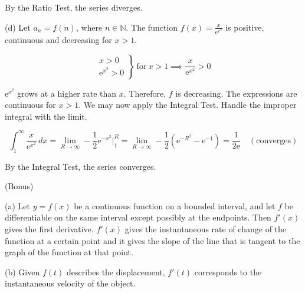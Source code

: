 \documentclass{article}
\begin{document}
\hfill

\noindent By the Ratio Test, the series diverges.

\hfill

\noindent (d) Let $a_n=f(n)$, where $n\in\mathbb{N}$. The function $\displaystyle f(x)=\frac x{\mathrm{e}^{x^2}}$ is positive, continuous and decreasing for $x>1$.

\[\left.\begin{array}{c}
x>0\\
\mathrm{e}^{x^2}>0
\end{array}\right\}\:\text{for}\: x>1\implies\frac x{\mathrm{e}^{x^2}}>0\]

\hfill

\noindent $\mathrm{e}^{x^2}$ grows at a higher rate than $x$. Therefore, $f$ is decreasing. The expressions are continuous for $x>1$. We may now apply the Integral Test. Handle the improper integral with the limit.

\[\int_1^\infty\frac x{\mathrm{e}^{x^2}}\,dx=\lim_{R\to\infty}-\frac12\mathrm{e}^{-x^2}\bigg|_1^R=\lim_{R\to\infty}-\frac12\left(\mathrm{e}^{-R^2}-\mathrm{e}^{-1}\right)=\frac1{2\mathrm{e}}\quad\left(\text{converges}\right)\]

\hfill

\noindent By the Integral Test, the series converges.

\hfill

\noindent (Bonus)

\hfill

\noindent (a) Let $y=f(x)$ be a continuous function on a bounded interval, and let $f$ be differentiable on the same interval except possibly at the endpoints. Then $f'(x)$ gives the first derivative. $f'(x)$ gives the instantaneous rate of change of the function at a certain point and it gives the slope of the line that is tangent to the graph of the function at that point.

\hfill

\noindent (b) Given $f(t)$ describes the displacement, $f'(t)$ corresponds to the instantaneous velocity of the object.
\end{document}
